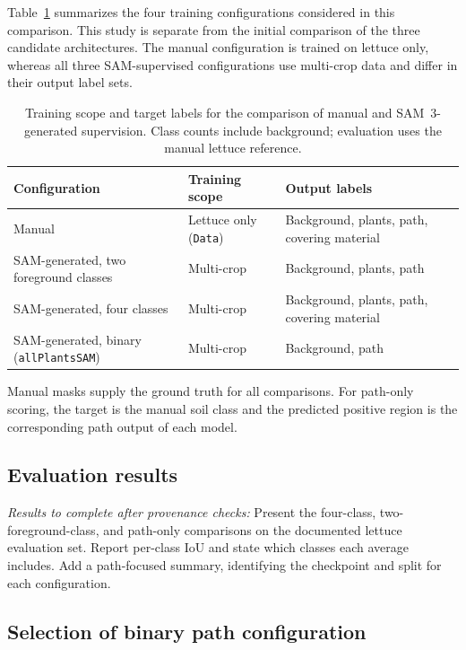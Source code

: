 Table~\ref{tab:c4_supervision_configurations} summarizes the four training
configurations considered in this comparison. This study is separate
from the initial comparison of the three candidate architectures.
The manual configuration is trained on lettuce only, whereas all three
SAM-supervised configurations use multi-crop data and differ in their
output label sets.

\begin{table}[htbp]
    \centering
    \small
    \caption{Training scope and target labels for the comparison of manual
    and SAM~3-generated supervision. Class counts include background;
    evaluation uses the manual lettuce reference.}
    \label{tab:c4_supervision_configurations}
    \begin{tabularx}{\textwidth}{@{}X X X@{}}
        \toprule
        Configuration & Training scope & Output labels \\
        \midrule
        Manual & Lettuce only (\texttt{Data}) &
        Background, plants, path, covering material \\
        SAM-generated, two foreground classes &
        Multi-crop & Background, plants, path \\
        SAM-generated, four classes &
        Multi-crop & Background, plants, path, covering material \\
        SAM-generated, binary (\texttt{allPlantsSAM}) &
        Multi-crop & Background, path \\
        \bottomrule
    \end{tabularx}
\end{table}

Manual masks supply the ground truth for all comparisons. For path-only
scoring, the target is the manual soil class and the predicted positive
region is the corresponding path output of each model.

\subsection{Evaluation results}
\label{subsec:c4_supervision_results}

\emph{Results to complete after provenance checks:} Present the four-class,
two-foreground-class, and path-only comparisons on the documented lettuce
evaluation set. Report per-class IoU and state which classes each average
includes. Add a path-focused summary, identifying the checkpoint and split
for each configuration.

\subsection{Selection of binary path configuration}
\label{subsec:c4_binary_selection}


